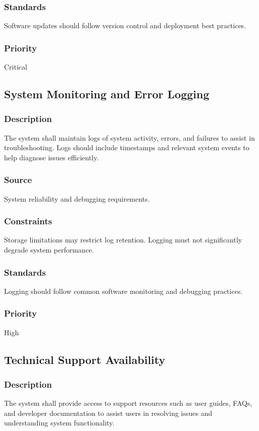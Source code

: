 \subsubsection{Standards}
Software updates should follow version control and deployment best practices.

\subsubsection{Priority}
Critical


\subsection{System Monitoring and Error Logging}
\subsubsection{Description}
The system shall maintain logs of system activity, errors, and failures to assist in troubleshooting. Logs should include timestamps and relevant system events to help diagnose issues efficiently.

\subsubsection{Source}
System reliability and debugging requirements.

\subsubsection{Constraints}
Storage limitations may restrict log retention. Logging must not significantly degrade system performance.

\subsubsection{Standards}
Logging should follow common software monitoring and debugging practices.

\subsubsection{Priority}
High


\subsection{Technical Support Availability}
\subsubsection{Description}
The system shall provide access to support resources such as user guides, FAQs, and developer documentation to assist users in resolving issues and understanding system functionality.


